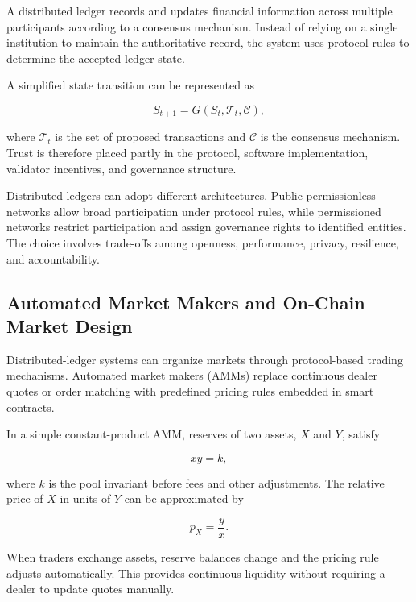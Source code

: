 A distributed ledger records and updates financial information across multiple participants according to a consensus mechanism. Instead of relying on a single institution to maintain the authoritative record, the system uses protocol rules to determine the accepted ledger state.

A simplified state transition can be represented as

\begin{equation}
S_{t+1}=G(S_t,\mathcal{T}_t,\mathcal{C}),
\label{eq:ch24-ledger-consensus}
\end{equation}

where \(\mathcal{T}_t\) is the set of proposed transactions and \(\mathcal{C}\) is the consensus mechanism. Trust is therefore placed partly in the protocol, software implementation, validator incentives, and governance structure.

Distributed ledgers can adopt different architectures. Public permissionless networks allow broad participation under protocol rules, while permissioned networks restrict participation and assign governance rights to identified entities. The choice involves trade-offs among openness, performance, privacy, resilience, and accountability.


\subsection{Automated Market Makers and On-Chain Market Design}

Distributed-ledger systems can organize markets through protocol-based trading mechanisms. Automated market makers (AMMs) replace continuous dealer quotes or order matching with predefined pricing rules embedded in smart contracts.

In a simple constant-product AMM, reserves of two assets, \(X\) and \(Y\), satisfy

\begin{equation}
xy=k,
\label{eq:ch24-amm-constant-product}
\end{equation}

where \(k\) is the pool invariant before fees and other adjustments. The relative price of \(X\) in units of \(Y\) can be approximated by

\begin{equation}
p_X=\frac{y}{x}.
\label{eq:ch24-amm-price}
\end{equation}

When traders exchange assets, reserve balances change and the pricing rule adjusts automatically. This provides continuous liquidity without requiring a dealer to update quotes manually.


